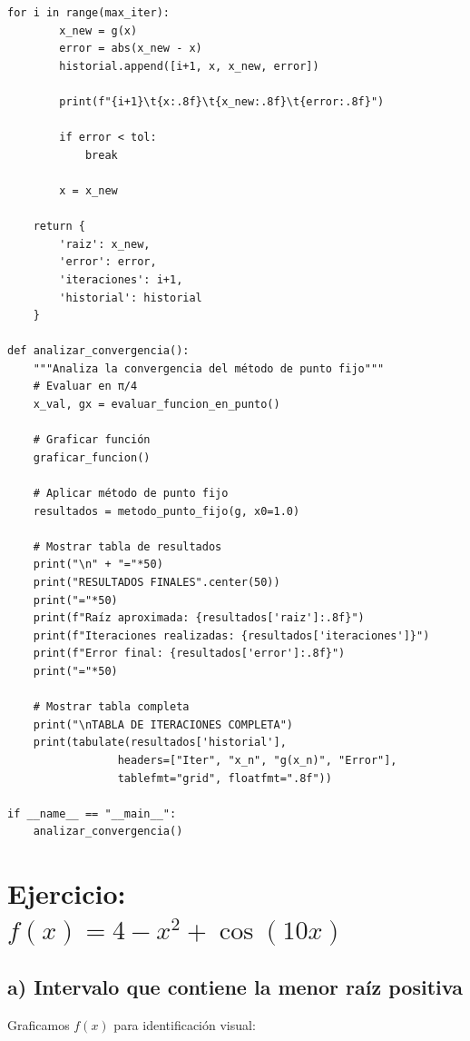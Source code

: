 \documentclass[12pt]{article}
\begin{document}
\begin{center}
\begin{tcolorbox}[title=Codigo python,
                  colback=white,
                  colframe=black,
                  breakable, enhanced]
\begin{lstlisting}[style=mypython]
    for i in range(max_iter):
        x_new = g(x)
        error = abs(x_new - x)
        historial.append([i+1, x, x_new, error])
        
        print(f"{i+1}\t{x:.8f}\t{x_new:.8f}\t{error:.8f}")
        
        if error < tol:
            break
            
        x = x_new
    
    return {
        'raiz': x_new,
        'error': error,
        'iteraciones': i+1,
        'historial': historial
    }

def analizar_convergencia():
    """Analiza la convergencia del método de punto fijo"""
    # Evaluar en π/4
    x_val, gx = evaluar_funcion_en_punto()
    
    # Graficar función
    graficar_funcion()
    
    # Aplicar método de punto fijo
    resultados = metodo_punto_fijo(g, x0=1.0)
    
    # Mostrar tabla de resultados
    print("\n" + "="*50)
    print("RESULTADOS FINALES".center(50))
    print("="*50)
    print(f"Raíz aproximada: {resultados['raiz']:.8f}")
    print(f"Iteraciones realizadas: {resultados['iteraciones']}")
    print(f"Error final: {resultados['error']:.8f}")
    print("="*50)
    
    # Mostrar tabla completa
    print("\nTABLA DE ITERACIONES COMPLETA")
    print(tabulate(resultados['historial'], 
                 headers=["Iter", "x_n", "g(x_n)", "Error"], 
                 tablefmt="grid", floatfmt=".8f"))

if __name__ == "__main__":
    analizar_convergencia()
\end{lstlisting}
\end{tcolorbox}


\section*{Ejercicio: \(f(x) = 4 - x^2 + \cos(10x)\)}

\subsection*{a) Intervalo que contiene la menor raíz positiva}

Graficamos \(f(x)\) para identificación visual:

\begin{center}
\end{center}


\end{center}
\end{document}
